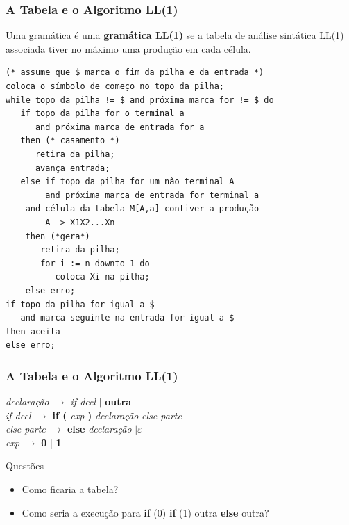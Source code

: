 \documentclass[table]{beamer}
\begin{document}
\begin{frame}[fragile]
   \frametitle{A Tabela e o Algoritmo LL(1)}
   \footnotesize
   Uma gramática é uma \textbf{gramática LL(1)} se a tabela de análise sintática LL(1) associada tiver no máximo uma produção em cada célula.
   \scriptsize
   \begin{verbatim}
(* assume que $ marca o fim da pilha e da entrada *)
coloca o símbolo de começo no topo da pilha;
while topo da pilha != $ and próxima marca for != $ do 
   if topo da pilha for o terminal a
      and próxima marca de entrada for a
   then (* casamento *)
      retira da pilha;
      avança entrada;
   else if topo da pilha for um não terminal A
        and próxima marca de entrada for terminal a
	and célula da tabela M[A,a] contiver a produção
	    A -> X1X2...Xn
	then (*gera*)
	   retira da pilha;
	   for i := n downto 1 do
	      coloca Xi na pilha;
	else erro;
if topo da pilha for igual a $
   and marca seguinte na entrada for igual a $
then aceita
else erro;
   \end{verbatim}
\end{frame}

\begin{frame}
   \frametitle{A Tabela e o Algoritmo LL(1)}
   \textit{declaração} $\to$ \textit{if-decl} $|$ \textbf{outra} \\
   \textit{if-decl} $\to$ \textbf{if (} \textit{exp} \textbf{)} \textit{declaração} \textit{else-parte} \\ 
   \textit{else-parte} $\to$ \textbf{else} \textit{declaração} $| \varepsilon$ \\
   \textit{exp} $\to$ \textbf{0} $|$ \textbf{1}
   \begin{block}{Questões}
      \begin{itemize}
         \item Como ficaria a tabela?
	 \item Como seria a execução para \textbf{if} (0) \textbf{if} (1) outra \textbf{else} outra?
      \end{itemize}
   \end{block}
\end{frame}
\end{document}
